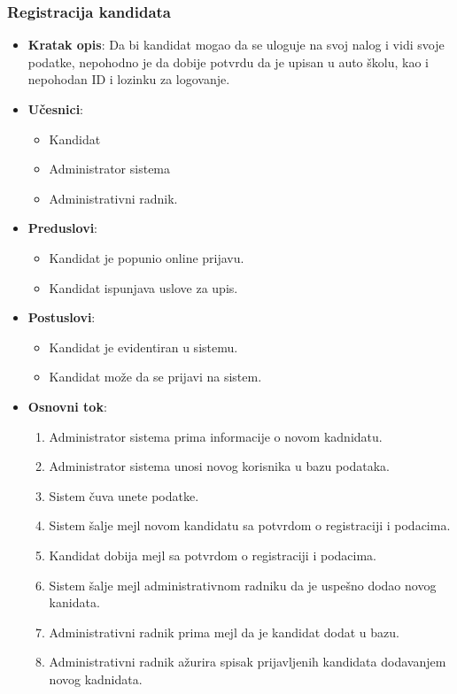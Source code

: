 \subsubsection{Registracija kandidata}
\label{subsubsec:registracija}
\begin{itemize}
  \item \textbf{Kratak opis}: Da bi kandidat mogao da se uloguje na svoj nalog i vidi svoje podatke, 
  nepohodno je da dobije potvrdu da je upisan u auto školu, kao i nepohodan ID i lozinku za logovanje.
  \item \textbf{Učesnici}:
  \begin{itemize}
    \item Kandidat
    \item Administrator sistema
    \item Administrativni radnik.
  \end{itemize}
  \item \textbf{Preduslovi}:
    \begin{itemize}
    \item  Kandidat je popunio online prijavu.
    \item  Kandidat ispunjava uslove za upis.
    \end{itemize}
  \item \textbf{Postuslovi}:
      \begin{itemize}
      \item Kandidat je evidentiran u sistemu.
      \item Kandidat može da se prijavi na sistem.
      \end{itemize}
  \item \textbf{Osnovni tok}:
      \begin{enumerate}
        \item Administrator sistema prima informacije o novom kadnidatu.
        \item Administrator sistema unosi novog korisnika u bazu podataka.
        \item Sistem čuva unete podatke.
        \item Sistem šalje mejl novom kandidatu sa potvrdom o registraciji i podacima.
        \item Kandidat dobija mejl sa potvrdom o registraciji i podacima.
        \item Sistem šalje mejl administrativnom radniku da je uspešno dodao novog kanidata.
        \item Administrativni radnik prima mejl da je kandidat dodat u bazu.
        \item Administrativni radnik ažurira spisak prijavljenih kandidata dodavanjem novog kadnidata.    
      \end{enumerate} 


\end{itemize}
